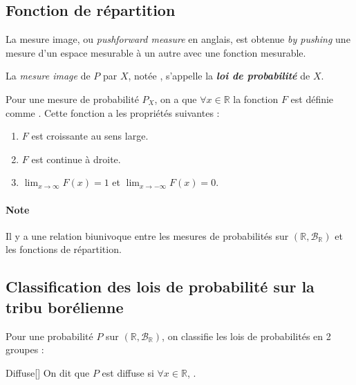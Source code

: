 \documentclass[10pt, french]{report}
\begin{document}
\begin{multicols*}{2}
\columnbreak
\section{Fonction de répartition}
\begin{definitionNOHFILL}
La mesure image, ou \og \textit{pushforward measure} \fg{} en anglais, est obtenue \og \textit{by pushing} \fg{} une mesure d'un espace mesurable à un autre avec une fonction mesurable.
\end{definitionNOHFILL}

\begin{definitionNOHFILL}
La \textit{mesure image} de $P$ par $X$, notée , s'appelle la \textbf{\textit{loi de probabilité}} de $X$.
\end{definitionNOHFILL}

\begin{definitionNOHFILLsub}
Pour une mesure de probabilité $P_{X}$, on a que $\forall x \in \mathbb{R}$ la fonction $F$ est définie comme \lfbox[formula]{$F(x) = P_{X}(]-\infty, x])$}. Cette fonction a les propriétés suivantes : 
\begin{enumerate}[label = \circled{\arabic*}{trueblue}]
	\item	$F$ est croissante au sens large.
	\item	$F$ est continue à droite.
	\item	$\lim_{x \rightarrow \infty} F(x) = 1$ et $\lim_{x \rightarrow -\infty} F(x) = 0$.
\end{enumerate}
\end{definitionNOHFILLsub}

\paragraph{Note}	Il y a une relation biunivoque entre les mesures de probabilités sur $(\mathbb{R}, \mathcal{B}_{\mathbb{R}})$ et les fonctions de répartition.

\bigskip

\subsection{Classification des lois de probabilité sur la tribu borélienne}
Pour une probabilité $P$ sur $(\mathbb{R}, \mathcal{B}_{\mathbb{R}})$, on classifie les lois de probabilités en 2 groupes :
\begin{definitionGENERAL}{Diffuse}[]
On dit que $P$ est diffuse si $\forall x \in \mathbb{R}$, .
\end{definitionGENERAL}


\end{multicols*}
\end{document}
